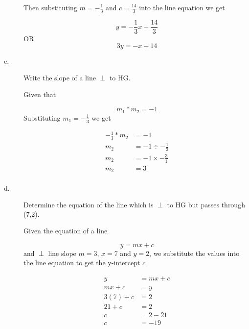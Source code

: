 \documentclass{article}
\begin{document}
\begin{description}
        Then substituting $m=-\frac{1}{3}$ and $c=\frac{14}{3}$ into the line equation we get

        $$
            y = -\frac{1}{3}x+\frac{14}{3}
        $$
        OR
        $$
            3y = -x + 14
        $$

    \item[c.] \begin{large}Write the slope of a line $\perp$ to HG.\end{large}

        Given that

        $$
            m_1 * m_2 = -1
        $$
        Substituting $m_1=-\frac{1}{3}$ we get

        $$
            \begin{aligned}
                -\frac{1}{3} * m_2 & = -1                     \\
                m_2                & = -1 \div -\frac{1}{3}   \\
                m_2                & = -1 \times -\frac{3}{1} \\
                m_2                & = 3                      \\
            \end{aligned}
        $$

    \item[d.] \begin{large}Determine the equation of the line which is $\perp$ to HG but passes through (7,2).\end{large}

        Given the equation of a line

        $$
            y = mx + c
        $$
        and $\perp$ line slope $m = 3$, $x = 7$ and $y=2$, we substitute the values into the line equation to get the y-intercept $c$

        $$
            \begin{aligned}
                y        & = mx + c \\
                mx + c   & = y      \\
                3(7) + c & = 2      \\
                21 + c   & = 2      \\
                c        & = 2 - 21 \\
                c        & = -19    \\
            \end{aligned}
        $$


\end{description}
\end{document}
